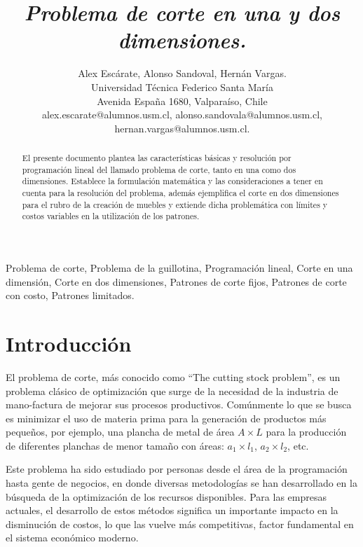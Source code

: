 \documentclass[journal, 10pt]{IEEEtran}
\begin{document}
\title{\textit{Problema de corte en una y dos dimensiones.}}
\author{
	Alex Escárate, Alonso Sandoval, Hernán Vargas.\\ 
	Universidad Técnica Federico Santa María \\
	Avenida España 1680, Valparaíso, Chile \\
	alex.escarate@alumnos.usm.cl, alonso.sandovala@alumnos.usm.cl,
	hernan.vargas@alumnos.usm.cl. \\ 
}

\maketitle
\begin{abstract}
	\boldmath El presente documento plantea las características básicas y 
	resolución por programación lineal del llamado problema de corte, tanto 
	en una como dos dimensiones. Establece la formulación matemática y las
	consideraciones a tener en cuenta para la resolución del problema, además
	ejemplifica el corte en dos dimensiones para el rubro de la creación 
	de muebles y extiende dicha problemática con límites y costos variables
	en la utilización de los patrones.
\end{abstract}

\begin{IEEEkeywords}
	Problema de corte, Problema de la guillotina, Programación lineal,
	Corte en una dimensión, Corte en dos dimensiones, Patrones de corte fijos,
	Patrones de corte con costo, Patrones limitados.
\end{IEEEkeywords}

\section{Introducción}
	El problema de corte, más conocido como ``The cutting stock problem'', es
	un problema clásico de optimización que surge de la necesidad de la 
	industria de mano-factura de mejorar sus procesos productivos. 
	Comúnmente lo que se busca es minimizar el uso de materia prima
	para la generación de productos más pequeños, por ejemplo, una plancha 
	de metal de área $A \times L$ para la producción de diferentes planchas de 
	menor tamaño con áreas: $a_1 \times l_1$, $a_2 \times l_2$, etc.
	
	Este problema ha sido estudiado por personas desde el área de la 
	programación hasta gente de negocios, en donde diversas metodologías se han
	desarrollado en la búsqueda de la optimización de los recursos disponibles. 
	Para las empresas actuales, el desarrollo de estos métodos significa un 
	importante impacto en la disminución de costos, lo que las vuelve más 
	competitivas, factor fundamental en el sistema económico moderno.
	
\end{document}
